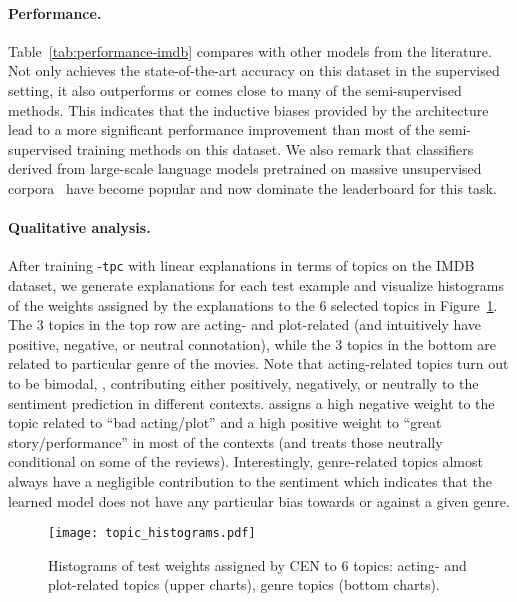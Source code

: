 \documentclass[twoside,11pt]{article}
\begin{document}
\paragraph{Performance.}
Table~\ref{tab:performance-imdb} compares {\CEN} with other models from the literature.
Not only {\CEN} achieves the state-of-the-art accuracy on this dataset in the supervised setting, it also outperforms or comes close to many of the semi-supervised methods.
This indicates that the inductive biases provided by the {\CEN} architecture lead to a more significant performance improvement than most of the semi-supervised training methods on this dataset.
We also remark that classifiers derived from large-scale language models pretrained on massive unsupervised corpora~\citep[\eg,][]{gray2017gpu, howard2018universal, xie2019unsupervised} have become popular and now dominate the leaderboard for this task.

\paragraph{Qualitative analysis.}
After training {\CEN}-\texttt{tpc} with linear explanations in terms of topics on the IMDB dataset, we generate explanations for each test example and visualize histograms of the weights assigned by the explanations to the 6 selected topics in Figure~\ref{fig:imdb-dict-hist}.
The 3 topics in the top row are acting- and plot-related (and intuitively have positive, negative, or neutral connotation), while the 3 topics in the bottom are related to particular genre of the movies.
Note that acting-related topics turn out to be bimodal, \ie, contributing either positively, negatively, or neutrally to the sentiment prediction in different contexts.
{\CEN} assigns a high negative weight to the topic related to ``bad acting/plot'' and a high positive weight to ``great story/performance'' in most of the contexts (and treats those neutrally conditional on some of the reviews).
Interestingly, genre-related topics almost always have a negligible contribution to the sentiment which indicates that the learned model does not have any particular bias towards or against a given genre.


\begin{figure}[t]
    \centering
    \texttt{[image: topic\_histograms.pdf]}
    \caption{Histograms of test weights assigned by CEN to 6 topics: acting- and plot-related topics (upper charts), genre topics (bottom charts).}
    \label{fig:imdb-dict-hist}
\end{figure}
 
\end{document}
